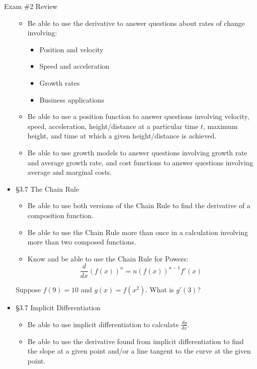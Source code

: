 \documentclass[cal1spr16Lectures.tex]{subfiles}
\begin{document}
\begin{frame}[allowframebreaks]{Exam \#2 Review}
\begin{itemize}
	\begin{itemize}\footnotesize
	\item Be able to use the derivative to answer questions about rates of change involving:
		\begin{itemize}%
		\item Position and velocity
		\item Speed and acceleration
		\item Growth rates
		\item Business applications
		\end{itemize}
\framebreak		
	\item Be able to use a position function to answer questions involving velocity, speed, acceleration, height/distance at a particular time $t$, maximum height, and time at which a given height/distance is achieved.
	\item Be able to use growth models to answer questions involving growth rate and average growth rate, and cost functions to answer questions involving average and marginal costs.
	\end{itemize}
%
\framebreak
\item \S 3.7 The Chain Rule
	\begin{itemize}\footnotesize
	\item Be able to use both versions of the Chain Rule to find the derivative of a composition function.
	\item Be able to use the Chain Rule more than once in a calculation involving more than two composed functions.
	\item Know and be able to use the Chain Rule for Powers:
	\[\frac{d}{dx}\left(f(x)\right)^n=n\left(f(x)\right)^{n-1}f'(x)\]
	\end{itemize}
\framebreak
\begin{exe} Suppose $f(9)=10$ and $g(x)=f(x^2)$.  What is $g'(3)$? \end{exe}
%
\framebreak
\item \S 3.7 Implicit Differentiation
	\begin{itemize}\footnotesize
	\item Be able to use implicit differentiation to calculate $\textstyle\frac{dy}{dx}.$
	\item Be able to use the derivative found from implicit differentiation to find the slope at a given point and/or a line tangent to the curve at the given point.

\end{itemize}
\end{itemize}
\end{frame}
\end{document}
